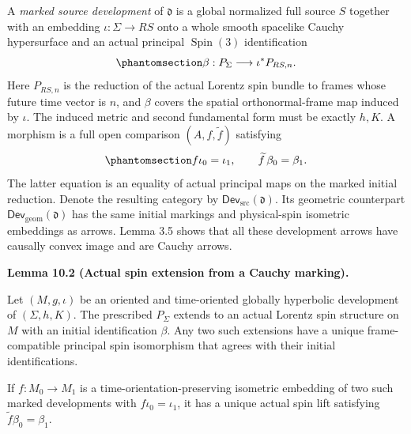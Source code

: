\documentclass[
  english,
  11pt,
  reqno]{amsart}
\makeatletter
\newcommand{\pandocstatementheading}[1]{%
  \par\addpenalty{\@beginparpenalty}%
  \addvspace{.5\baselineskip plus .2\baselineskip minus .2\baselineskip}%
  {\normalfont\bfseries #1\par}%
  \nobreak\@afterindenttrue\@afterheading
}
\makeatother
\begin{document}
A \emph{marked source development} of \(\mathfrak d\) is a global
normalized full source \(S\) together with an embedding
\(\iota:\Sigma\to RS\) onto a whole smooth spacelike Cauchy hypersurface
and an actual principal \(\operatorname{Spin}(3)\) identification
\begin{equation}\protect\phantomsection\label{eq:global-initial-spin-marking}{
\beta:P_\Sigma\longrightarrow\iota^*P_{RS,n}.
}\end{equation} Here \(P_{RS,n}\) is the reduction of the actual Lorentz
spin bundle to frames whose future time vector is \(n\), and \(\beta\)
covers the spatial orthonormal-frame map induced by \(\iota\). The
induced metric and second fundamental form must be exactly \(h,K\). A
morphism is a full open comparison \((A,f,\widetilde f)\) satisfying
\begin{equation}\protect\phantomsection\label{eq:global-marked-development-arrow}{
f\iota_0=\iota_1,
\qquad
\widetilde f\,\beta_0=\beta_1.
}\end{equation} The latter equation is an equality of actual principal
maps on the marked initial reduction. Denote the resulting category by
\(\mathsf{Dev}_{\mathrm{src}}(\mathfrak d)\). Its geometric counterpart
\(\mathsf{Dev}_{\mathrm{geom}}(\mathfrak d)\) has the same initial
markings and physical-spin isometric embeddings as arrows. Lemma 3.5
shows that all these development arrows have causally convex image and
are Cauchy arrows.

\pandocstatementheading{\protect{}\label{lem:global-initial-spin-extension}Lemma 10.2 (Actual spin extension from a Cauchy marking).}

Let \((M,g,\iota)\) be an oriented and time-oriented globally hyperbolic
development of \((\Sigma,h,K)\). The prescribed \(P_\Sigma\) extends to
an actual Lorentz spin structure on \(M\) with an initial identification
\(\beta\). Any two such extensions have a unique frame-compatible
principal spin isomorphism that agrees with their initial
identifications.

If \(f:M_0\to M_1\) is a time-orientation-preserving isometric embedding
of two such marked developments with \(f\iota_0=\iota_1\), it has a
unique actual spin lift satisfying \(\widetilde f\beta_0=\beta_1\).
\end{document}
